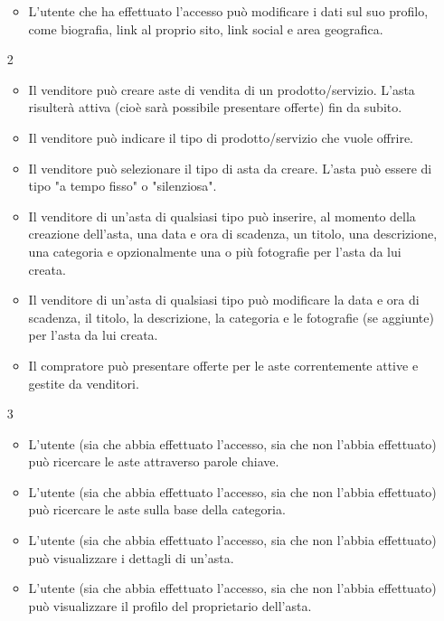 \begin{itemize}
\begin{itemize}
                    \item L'utente che ha effettuato l'accesso può modificare i dati sul suo profilo, come biografia, link al proprio sito, link social e area geografica.
                \end{itemize}
            \item[2] 
                \begin{itemize}
                    \item Il venditore può creare aste di vendita di un prodotto/servizio. L'asta risulterà attiva (cioè sarà possibile presentare offerte) fin da subito.
                    \item Il venditore può indicare il tipo di prodotto/servizio che vuole offrire.
                    \item Il venditore può selezionare il tipo di asta da creare. L'asta può essere di tipo "a tempo fisso" o "silenziosa".
                    \item Il venditore di un'asta di qualsiasi tipo può inserire, al momento della creazione dell'asta, una data e ora di scadenza, un titolo, una descrizione, una categoria e opzionalmente una o più fotografie per l'asta da lui creata.
                    \item Il venditore di un'asta di qualsiasi tipo può modificare la data e ora di scadenza, il titolo, la descrizione, la categoria e le fotografie (se aggiunte) per l'asta da lui creata.
                    \item Il compratore può presentare offerte per le aste correntemente attive e gestite da venditori.
                \end{itemize}
            \item[3]
                \begin{itemize}
                    \item L'utente (sia che abbia effettuato l'accesso, sia che non l'abbia effettuato) può ricercare le aste attraverso parole chiave.
                    \item L'utente (sia che abbia effettuato l'accesso, sia che non l'abbia effettuato) può ricercare le aste sulla base della categoria.
                    \item L'utente (sia che abbia effettuato l'accesso, sia che non l'abbia effettuato) può visualizzare i dettagli di un'asta.
                    \item L'utente (sia che abbia effettuato l'accesso, sia che non l'abbia effettuato) può visualizzare il profilo del proprietario dell'asta.

\end{itemize}
\end{itemize}
